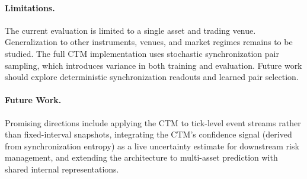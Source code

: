 \documentclass[11pt]{article}
\begin{document}
\paragraph{Limitations.}
The current evaluation is limited to a single asset and trading venue.
Generalization to other instruments, venues, and market regimes remains to be
studied. The full CTM implementation uses stochastic synchronization pair
sampling, which introduces variance in both training and evaluation. Future work
should explore deterministic synchronization readouts and learned pair
selection.

\paragraph{Future Work.}
Promising directions include applying the CTM to tick-level event streams
rather than fixed-interval snapshots, integrating the CTM's confidence signal
(derived from synchronization entropy) as a live uncertainty estimate for
downstream risk management, and extending the architecture to multi-asset
prediction with shared internal representations.



\end{document}
